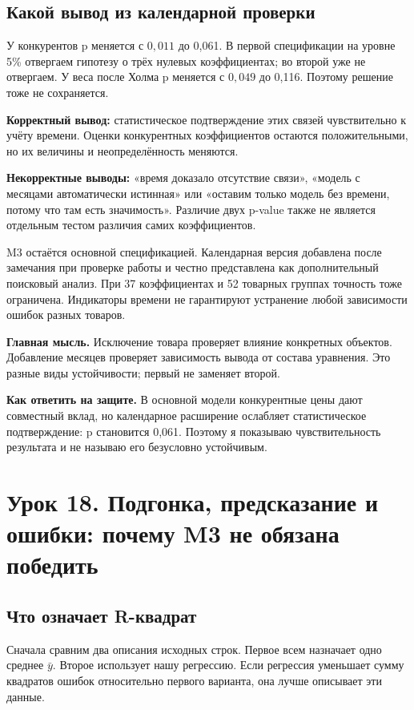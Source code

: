 \documentclass[12pt,a4paper]{article}
\newcommand{\idea}[1]{\par\textbf{Главная мысль.} #1\par}
\newcommand{\answer}[1]{\par\textbf{Как ответить на защите.} #1\par}
\begin{document}
\subsection{Какой вывод из календарной проверки}

У конкурентов p меняется с $0{,}011$ до 0,061. В первой спецификации на уровне 5\% отвергаем гипотезу о трёх нулевых коэффициентах; во второй уже не отвергаем. У веса после Холма p меняется с $0{,}049$ до 0,116. Поэтому решение тоже не сохраняется.

\textbf{Корректный вывод:} статистическое подтверждение этих связей чувствительно к учёту времени. Оценки конкурентных коэффициентов остаются положительными, но их величины и неопределённость меняются.

\textbf{Некорректные выводы:} «время доказало отсутствие связи», «модель с месяцами автоматически истинная» или «оставим только модель без времени, потому что там есть значимость». Различие двух p-value также не является отдельным тестом различия самих коэффициентов.

M3 остаётся основной спецификацией. Календарная версия добавлена после замечания при проверке работы и честно представлена как дополнительный поисковый анализ. При 37 коэффициентах и 52 товарных группах точность тоже ограничена. Индикаторы времени не гарантируют устранение любой зависимости ошибок разных товаров.

\idea{Исключение товара проверяет влияние конкретных объектов. Добавление месяцев проверяет зависимость вывода от состава уравнения. Это разные виды устойчивости; первый не заменяет второй.}

\answer{В основной модели конкурентные цены дают совместный вклад, но календарное расширение ослабляет статистическое подтверждение: p становится 0,061. Поэтому я показываю чувствительность результата и не называю его безусловно устойчивым.}

\section{Урок 18. Подгонка, предсказание и ошибки: почему M3 не обязана победить}

\subsection{Что означает R-квадрат}

Сначала сравним два описания исходных строк. Первое всем назначает одно среднее $\bar y$. Второе использует нашу регрессию. Если регрессия уменьшает сумму квадратов ошибок относительно первого варианта, она лучше описывает эти данные.
\end{document}
